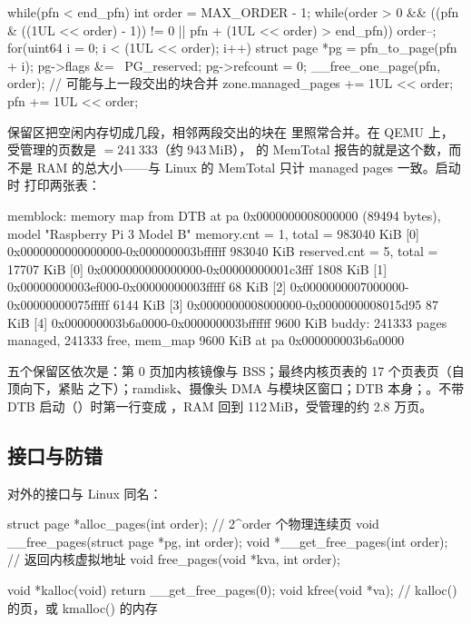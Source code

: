 \begin{ccode}
while(pfn < end_pfn){
  int order = MAX_ORDER - 1;
  while(order > 0 &&
        ((pfn & ((1UL << order) - 1)) != 0 || pfn + (1UL << order) > end_pfn))
    order--;
  for(uint64 i = 0; i < (1UL << order); i++){
    struct page *pg = pfn_to_page(pfn + i);
    pg->flags &= ~PG_reserved;
    pg->refcount = 0;
  }
  __free_one_page(pfn, order);  // 可能与上一段交出的块合并
  zone.managed_pages += 1UL << order;
  pfn += 1UL << order;
}
\end{ccode}

保留区把空闲内存切成几段，相邻两段交出的块在  里照常合并。在 QEMU 上，受管理的页数是 $=241\,333$（约 943\,MiB）， 的 MemTotal 报告的就是这个数，而不是 RAM 的总大小——与 Linux 的 MemTotal 只计 managed pages 一致。启动时  打印两张表：

\begin{txtcode}
memblock: memory map from DTB at pa 0x0000000008000000 (89494 bytes),
          model "Raspberry Pi 3 Model B"
  memory.cnt = 1, total = 983040 KiB
    [0] 0x0000000000000000-0x000000003bffffff 983040 KiB
  reserved.cnt = 5, total = 17707 KiB
    [0] 0x0000000000000000-0x00000000001c3fff 1808 KiB
    [1] 0x00000000003ef000-0x00000000003fffff 68 KiB
    [2] 0x0000000007000000-0x00000000075fffff 6144 KiB
    [3] 0x0000000008000000-0x0000000008015d95 87 KiB
    [4] 0x000000003b6a0000-0x000000003bffffff 9600 KiB
buddy: 241333 pages managed, 241333 free,
       mem_map 9600 KiB at pa 0x000000003b6a0000
\end{txtcode}

五个保留区依次是：第 0 页加内核镜像与 BSS；最终内核页表的 17 个页表页（自顶向下，紧贴  之下）；ramdisk、摄像头 DMA 与模块区窗口；DTB 本身；。不带 DTB 启动（）时第一行变成 ，RAM 回到 112\,MiB，受管理的约 2.8 万页。

\subsection{接口与防错}

对外的接口与 Linux 同名：

\begin{ccode}
struct page *alloc_pages(int order);          // 2^order 个物理连续页
void         __free_pages(struct page *pg, int order);
void        *__get_free_pages(int order);     // 返回内核虚拟地址
void         free_pages(void *kva, int order);

void *kalloc(void)   { return __get_free_pages(0); }
void  kfree(void *va);   // kalloc() 的页，或 kmalloc() 的内存
\end{ccode}

